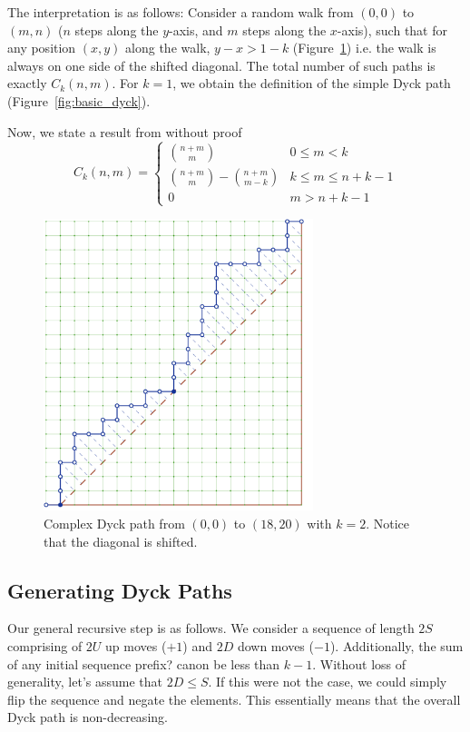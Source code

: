 The interpretation is as follows:
Consider a random walk from $(0,0)$ to $(m, n)$ ($n$ steps along the $y$-axis, and $m$ steps along the $x$-axis),
such that for any position $(x, y)$ along the walk, $y-x > 1-k$ (Figure~\ref{fig:complex_dyck})
i.e. the walk is always on one side of the shifted diagonal.
The total number of such paths is exactly $C_k(n,m)$.
For $k = 1$, we obtain the definition of the simple Dyck path (Figure~\ref{fig:basic_dyck}).

Now, we state a result from \cite{trap} without proof
$$
C_k(n,m)=
\begin{cases}
{n+m}\choose m &0\le m<k\\
{{n+m}\choose{m}} - {{n+m}\choose{m-k}} &k\le m\le n+k-1\\
0 &m>n+k-1
\end{cases}
$$

\begin{figure}[htbp]
    \centering
    \includegraphics[width=0.7\textwidth]{dyck/complex_dyck_path.pdf}
    \caption{Complex Dyck path from $(0, 0)$ to $(18, 20)$ with $k = 2$. Notice that the diagonal is shifted.}
    \label{fig:complex_dyck}
\end{figure}

\subsection{Generating Dyck Paths}
Our general recursive step is as follows.
We consider a sequence of length $2S$ comprising of $2U$ up moves ($+1$) and $2D$ down moves ($-1$).
Additionally, the sum of any initial sequence {\color{red} prefix?} canon be less than $k-1$.
Without loss of generality, let's assume that $2D\le S$. If this were not the case,
we could simply flip the sequence and negate the elements.
This essentially means that the overall Dyck path is non-decreasing.

